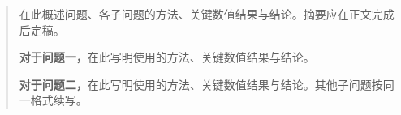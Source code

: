 \begin{abstract}
在此概述问题、各子问题的方法、关键数值结果与结论。摘要应在正文完成后定稿。

\textbf{对于问题一，}在此写明使用的方法、关键数值结果与结论。

\textbf{对于问题二，}在此写明使用的方法、关键数值结果与结论。其他子问题按同一格式续写。

\end{abstract}
